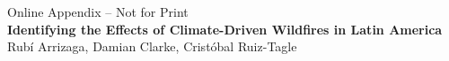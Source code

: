 \documentclass[11pt]{article}
\begin{document}
\begin{spacing}{1.3}





%
%

\end{spacing}
\clearpage



\begin{spacing}{1.3}


\clearpage
\appendix
\setcounter{page}{1}
\renewcommand{\thepage}{A\arabic{page}}



\begin{center}
{\Large Online Appendix -- Not for Print}\\
\textbf{Identifying the Effects of Climate-Driven Wildfires in Latin America} \\
Rub\'i Arrizaga, Damian Clarke, Crist\'obal Ruiz-Tagle
\end{center}
\end{spacing}
\end{document}

